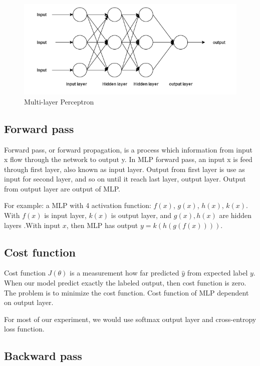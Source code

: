 \begin{figure}[H]
	\centering
	\includegraphics[width=0.7\linewidth]{../figure/multilayerperceptron}
	\caption[Multi-layer Perceptron]{Multi-layer Perceptron}
	\label{fig:multilayerperceptron}
\end{figure}

\subsection{Forward pass}
Forward pass, or forward propagation, is a process which information from input x flow through the network to output y. In MLP forward pass, an input x is feed through first layer, also known as input layer. Output from first layer is use as input for second layer, and so on until it reach last layer, output layer. Output from output layer are output of MLP. 

For example: a MLP with 4 activation function: $f(x)$, $g(x)$, $h(x)$, $k(x)$. With $f(x)$ is input layer, $k(x)$ is output layer, and $g(x), h(x)$ are hidden layers .With input $x$, then MLP has output $ y = k(h(g(f(x))))$.

\subsection{Cost function}
Cost function $J(\theta)$  is a measurement how far predicted  $\hat y$ from expected label $y$. When our model predict exactly the labeled output, then cost function is zero. The problem is to minimize the cost function. Cost function of MLP dependent on output layer.

For most of our experiment, we would use softmax output layer and cross-entropy loss function.
\subsection{Backward pass}



